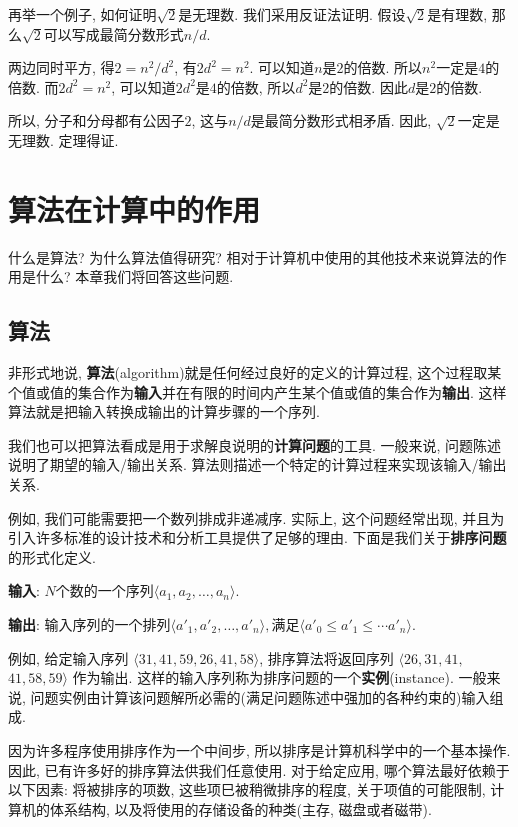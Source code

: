\documentclass[oneside,10pt,fontset=none]{ctexbook}
\numberwithin{definition}{chapter}
\numberwithin{theorem}{chapter}
\numberwithin{lemma}{chapter}
\begin{document}
再举一个例子, 如何证明$\sqrt{2}$是无理数. 我们采用反证法证明. 假设$\sqrt{2}$是有理数, 那么$\sqrt{2}$可以写成最简分数形式$n/d$.

两边同时平方, 得$2=n^2/d^2$, 有$2d^2=n^2$. 可以知道$n$是$2$的倍数. 所以$n^2$一定是$4$的倍数. 而$2d^2=n^2$, 可以知道$2d^2$是$4$的倍数, 所以$d^2$是$2$的倍数. 因此$d$是$2$的倍数.

所以, 分子和分母都有公因子$2$, 这与$n/d$是最简分数形式相矛盾. 因此, $\sqrt{2}$一定是无理数. 定理得证.

\chapter{算法在计算中的作用}\label{chapter:算法在计算中的作用}

什么是算法? 为什么算法值得研究? 相对于计算机中使用的其他技术来说算法的作用是什么? 本章我们将回答这些问题.

\section{算法}

非形式地说, \textbf{算法}(algorithm)就是任何经过良好的定义的计算过程, 这个过程取某个值或值的集合作为\textbf{输入}并在有限的时间内产生某个值或值的集合作为\textbf{输出}. 这样算法就是把输入转换成输出的计算步骤的一个序列.

我们也可以把算法看成是用于求解良说明的\textbf{计算问题}的工具. 一般来说, 问题陈述说明了期望的输入/输出关系. 算法则描述一个特定的计算过程来实现该输入/输出关系.

例如, 我们可能需要把一个数列排成非递减序. 实际上, 这个问题经常出现, 并且为引入许多标准的设计技术和分析工具提供了足够的理由. 下面是我们关于\textbf{排序问题}的形式化定义.

\textbf{输入}: $N$个数的一个序列$\langle a_1, a_2, \dots, a_n\rangle$.

\textbf{输出}: 输入序列的一个排列$\langle a'_1, a'_2, \dots, a'_n\rangle , \text{满足}\langle a'_0\leq a'_1 \leq\cdots a'_n\rangle$.

例如, 给定输入序列 $\langle 31, 41, 59, 26, 41, 58\rangle$, 排序算法将返回序列 $\langle 26, 31, 41,$ $ 41, 58, 59\rangle$ 作为输出. 这样的输入序列称为排序问题的一个\textbf{实例}(instance). 一般来说, 问题实例由计算该问题解所必需的(满足问题陈述中强加的各种约束的)输入组成.

因为许多程序使用排序作为一个中间步, 所以排序是计算机科学中的一个基本操作. 因此, 已有许多好的排序算法供我们任意使用. 对于给定应用, 哪个算法最好依赖于以下因素: 将被排序的项数, 这些项巳被稍微排序的程度, 关于项值的可能限制, 计算机的体系结构, 以及将使用的存储设备的种类(主存, 磁盘或者磁带).
\end{document}
